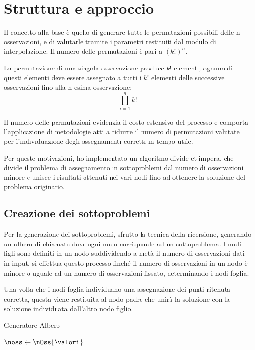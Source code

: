 \documentclass[a4paper,12pt]{report}
\begin{document}
\section{Struttura e approccio}

Il concetto alla base è quello di generare tutte le permutazioni possibili delle n osservazioni, e di valutarle tramite i parametri restituiti dal modulo di interpolazione. Il numero delle permutazioni è pari a $(k!)^{n}$.

La permutazione di una singola osservazione produce $k!$ elementi, ognuno di questi elementi deve essere assegnato a tutti i $k!$ elementi delle successive osservazioni fino alla n-esima osservazione:
\begin{equation}
 \label{numPerm}
  \prod_{i=1}^{n}k!
\end{equation}

Il numero delle permutazioni evidenzia il costo estensivo del processo e comporta l'applicazione di metodologie atti a ridurre il numero di permutazioni valutate per l'individuazione degli assegnamenti corretti in tempo utile.

Per queste motivazioni, ho implementato un algoritmo divide et impera, che divide il problema di assegnamento in sottoproblemi dal numero di osservazioni minore e unisce i risultati ottenuti nei vari nodi fino ad ottenere la soluzione del problema originario.

\subsection{Creazione dei sottoproblemi}

  Per la generazione dei sottoproblemi, sfrutto la tecnica della ricorsione, generando un albero di chiamate dove ogni nodo corrisponde ad un sottoproblema.
  I nodi figli sono definiti in un nodo suddividendo a metà il numero di osservazioni dati in input, si effettua questo processo finché il numero di osservazioni in un nodo è minore o uguale ad un numero di osservazioni fissato, determinando i nodi foglia.

  Una volta che i nodi foglia individuano una assegnazione dei punti ritenuta corretta, questa viene restituita al nodo padre che unirà la soluzione con la soluzione individuata dall'altro nodo figlio.
  \begin{algorithm}
  \caption{Generatore Albero}\label{alg:genera_albero}
  $\noss \leftarrow \nOss{\valori}$ \\
  \Return {} \\

  \end{algorithm}
\end{document}
